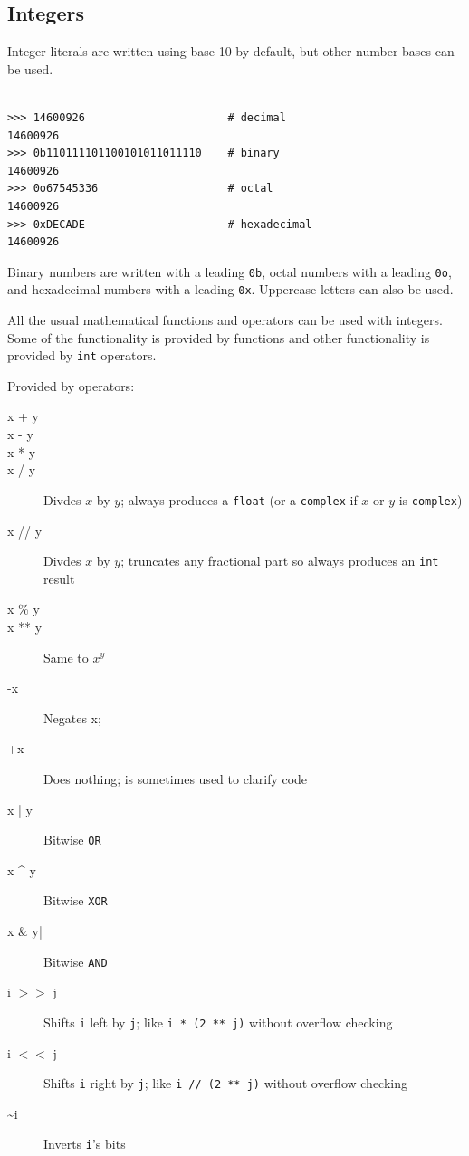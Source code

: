 \subsection{Integers}

Integer literals are written using base 10 by default, but other number bases can be used.

\begin{lstlisting}

>>> 14600926                      # decimal
14600926
>>> 0b110111101100101011011110    # binary
14600926                          
>>> 0o67545336                    # octal
14600926
>>> 0xDECADE                      # hexadecimal
14600926
\end{lstlisting}



Binary numbers are written with a leading \verb|0b|,
octal numbers with a leading \verb|0o|, and
hexadecimal numbers with a leading \verb|0x|.
Uppercase letters can also be used.



All the usual mathematical functions and operators can be used with integers.
Some of the functionality is provided by functions and other functionality is provided by \verb|int| operators.


Provided by operators:
\begin{description}
\item[x + y] 
\item[x - y]
\item[x * y] 
\item[x / y] Divdes $x$ by $y$; always produces a \verb|float| (or a \verb|complex| if $x$ or $y$ is \verb|complex|)
\item[x // y] Divdes $x$ by $y$; truncates any fractional part so always produces an \verb|int| result
\item[x \% y]   
\item[x ** y] Same to $x^y$
\item[-x] Negates x;
\item[+x] Does nothing; is sometimes used to clarify code
\item[x | y] Bitwise \verb|OR| 
\item[x \^{} y] Bitwise \verb|XOR|
\item[x \&{} y|] Bitwise \verb|AND|
\item[i $>>$ j] Shifts \verb|i| left by \verb|j|; like \verb|i * (2 ** j)| without overflow checking
\item[i $<<$ j] Shifts \verb|i| right by \verb|j|; like \verb|i // (2 ** j)| without overflow checking
\item[\~{}i]  Inverts \verb|i|'s bits
\end{description}

